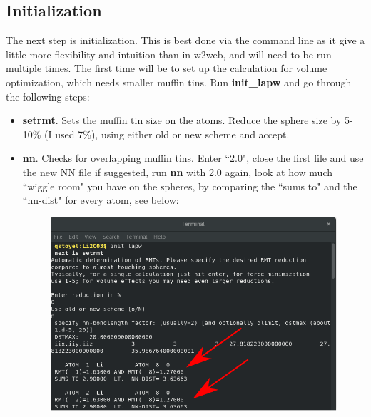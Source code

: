 \documentclass[12pt]{article}
\begin{document}
\subsection{Initialization}
The next step is initialization.  This is best done via the command line as it give a little more flexibility and intuition than in w2web, and will need to be run multiple times. The first time will be to set up the calculation for volume optimization, which needs smaller muffin tins.  Run \textbf{init\_lapw} and go through the following steps:

\begin{itemize}
	\item \textbf{setrmt}. Sets the muffin tin size on the atoms.  Reduce the sphere size by 5-10\% (I used 7\%), using either old or new scheme and accept.
	\item  \textbf{nn}.  Checks for overlapping muffin tins. Enter ``2.0", close the first file and use the new NN file if suggested, run \textbf{nn} with 2.0 again, look at how much ``wiggle room" you have on the spheres, by comparing the ``sums to" and the ``nn-dist" for every atom, see below:
	
	\begin{figure}[H]
		\includegraphics[scale=0.4]{./images/init_lapw2.png}
	\end{figure}
	

\end{itemize}
\end{document}
